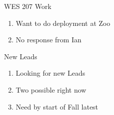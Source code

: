 \begin{frame}{WES 207 Work}
    \begin{enumerate}
        \item Want to do deployment at Zoo
        \item No response from Ian
    \end{enumerate}
\end{frame}

\begin{frame}{New Leads}
    \begin{enumerate}
        \item Looking for new Leads
        \item Two possible right now
        \item Need by start of Fall latest
    \end{enumerate}
\end{frame}